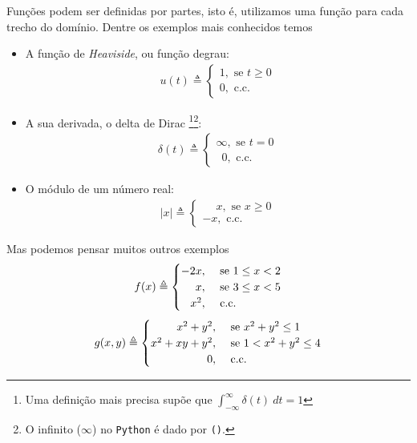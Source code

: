 \documentclass[12pt]{article}
\begin{document}
	Funções podem ser definidas por partes, isto é, utilizamos uma função para cada trecho do domínio. Dentre os exemplos mais conhecidos temos

\begin{itemize}

	\item[] A função de \textit{Heaviside}, ou função degrau:
	\begin{align*}
		u(t) \triangleq	\begin{cases}
		1, \text{ se } t \geq 0\\
		0, \text{ c.c.}
		\end{cases}
	\end{align*}
	
	\item[] A sua derivada, o delta de Dirac \footnote{Uma definição mais precisa supõe que $\displaystyle \int_{-\infty}^{\infty} \delta(t)\ dt = 1$}\footnote{O infinito ($\infty$) no \texttt{Python} é dado por \texttt{()}.}:
	\begin{align*}
		\delta(t) \triangleq	\begin{cases}
		\infty, \text{ se } t = 0\\
		\phantom{0}0, \text{ c.c.}
		\end{cases}
	\end{align*}
	
	\item[] O módulo de um número real:
	\begin{align*}
		|x| \triangleq	\begin{cases}
		\phantom{-}x, \text{ se } x \geq 0\\
		-x, \text{ c.c.}
		\end{cases}
	\end{align*}	
\end{itemize}
	
	Mas podemos pensar muitos outros exemplos
	\begin{align*}
		f(x) \triangleq	\begin{cases}
		\hfill -2x,& \text{ se } 1 \leq x < 2\\ 
		\hfill x,& \text{ se } 3 \leq x < 5\\
		\hfill x^2,& \text{ c.c.}
		\end{cases}
	\end{align*}
	\begin{align*}
		g(x, y) \triangleq	\begin{cases}
		\hfill x^2 + y^2,& \text{ se } x^2 + y^2 \leq 1\\
		\hfill x^2 + xy + y^2,& \text{ se } 1 < x^2 + y^2 \leq 4\\
		\hfill 0,& \text{ c.c.}\\
		\end{cases}
	\end{align*}
\end{document}
